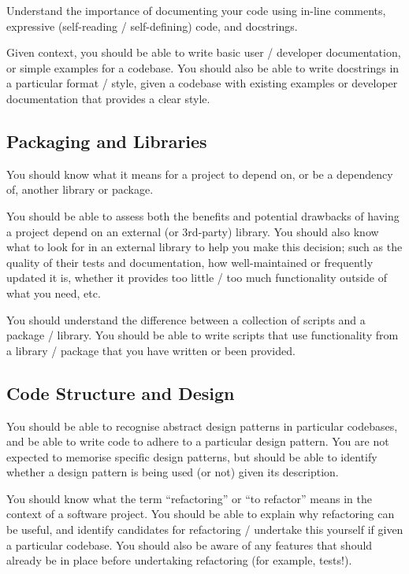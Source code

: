 Understand the importance of documenting your code using in-line comments, expressive (self-reading / self-defining) code, and docstrings.

Given context, you should be able to write basic user / developer documentation, or simple examples for a codebase.
You should also be able to write docstrings in a particular format / style, given a codebase with existing examples or developer documentation that provides a clear style.

\subsection{Packaging and Libraries}

You should know what it means for a project to depend on, or be a dependency of, another library or package.

You should be able to assess both the benefits and potential drawbacks of having a project depend on an external (or 3rd-party) library.
You should also know what to look for in an external library to help you make this decision; such as the quality of their tests and documentation, how well-maintained or frequently updated it is, whether it provides too little / too much functionality outside of what you need, etc.

You should understand the difference between a collection of scripts and a package / library.
You should be able to write scripts that use functionality from a library / package that you have written or been provided.

\subsection{Code Structure and Design}

You should be able to recognise abstract design patterns in particular codebases, and be able to write code to adhere to a particular design pattern.
You are not expected to memorise specific design patterns, but should be able to identify whether a design pattern is being used (or not) given its description.

You should know what the term ``refactoring'' or ``to refactor'' means in the context of a software project.
You should be able to explain why refactoring can be useful, and identify candidates for refactoring / undertake this yourself if given a particular codebase.
You should also be aware of any features that should already be in place before undertaking refactoring (for example, tests!).

